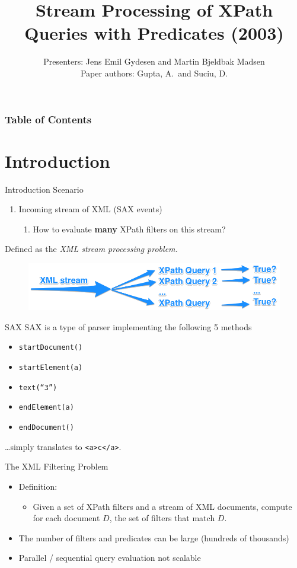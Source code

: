 \documentclass[mathserif,serif]{beamer}
\title{\large Stream Processing of XPath Queries with Predicates (2003)}
\author{Presenters: Jens Emil Gydesen and Martin Bjeldbak Madsen \\
        Paper authors: Gupta, A.\ and Suciu, D.}
\date{\DTMdisplaydate{2015}{6}{4}{3}}
\begin{document}
\frame{\titlepage}

\begin{frame}
  \frametitle{Table of Contents}
  \tableofcontents[hideallsubsections]
\end{frame}


\section{Introduction}
\begin{frame}{Introduction}
  Scenario
  \begin{enumerate}
    \item Incoming stream of XML (SAX events)
      \begin{enumerate}
        \item How to evaluate \textbf{many} XPath filters on this stream?
      \end{enumerate}
  \end{enumerate}
  Defined as the \textit{XML stream processing problem.}

  \begin{figure}[<+htpb+>]
    \centering
    \includegraphics[width=\linewidth]{processing-problem.png}
  \end{figure}
\end{frame}

\begin{frame}{SAX}
  SAX is a type of parser implementing the following 5 methods
  \begin{itemize}
    \item[] \texttt{startDocument()}
    \item[] \quad\texttt{startElement(a)}
    \item[] \quad\quad\texttt{text(``3'')}
    \item[] \quad\texttt{endElement(a)}
    \item[] \texttt{endDocument()}
  \end{itemize}
  \dots simply translates to \texttt{<a>c</a>}.
\end{frame}
\begin{frame}{The XML Filtering Problem}
  \begin{itemize}
    \item Definition:
      \begin{itemize}
        \item Given a set of XPath filters and a stream of XML documents, compute for each document $D$, the set of filters that match $D$.
      \end{itemize}
    \item The number of filters and predicates can be large (hundreds of thousands)
    \item Parallel / sequential query evaluation not scalable
  \end{itemize}
\end{frame}
\end{document}
